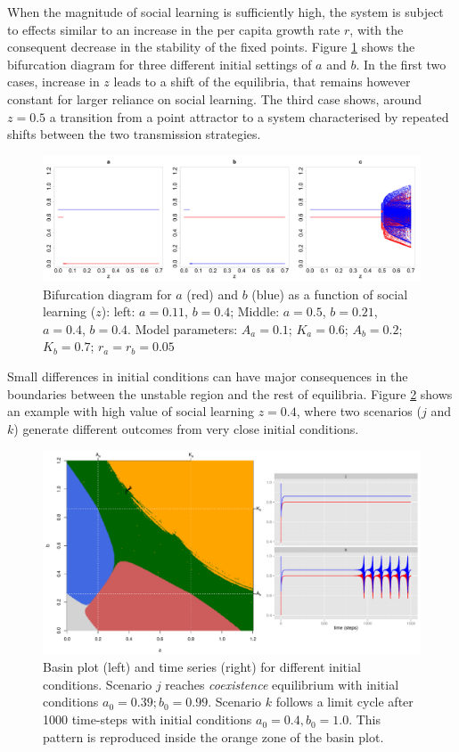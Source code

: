 \documentclass[preprint,authoryear]{elsarticle}
\begin{document}
When the magnitude of social learning is sufficiently high, the system is subject to effects similar to an increase in the per capita growth rate $r$, with the consequent decrease in the stability of the fixed points. Figure \ref{fig:bifurcationWithTransmission} shows the bifurcation diagram for three different initial settings of $a$ and $b$. In the first two cases, increase in $z$ leads to a shift of the equilibria, that remains however constant for larger reliance on social learning. The third case shows, around $z=0.5$ a transition from a point attractor to a system characterised by repeated shifts between the two transmission strategies. 
\begin{figure}[h!]
  \centering
      \includegraphics[width=\textwidth]{./figures/figure4.jpg}
  \caption{Bifurcation diagram for $a$ (red) and $b$ (blue) as a function of social learning ($z$): left: $a=0.11$, $b=0.4$; Middle: $a=0.5$, $b=0.21$, $a=0.4$, $b=0.4$. Model parameters:  $A_a=0.1$; $K_a=0.6$; $A_b=0.2$; $K_b=0.7$; $r_a=r_b=0.05$}
    \label{fig:bifurcationWithTransmission}
\end{figure}

Small differences in initial conditions can have major consequences in the boundaries between the unstable region and the rest of equilibria. Figure \ref{fig:unstable} shows an example with high value of social learning $z=0.4$, where two scenarios ($j$ and $k$) generate different outcomes from very close initial conditions.

\begin{figure}[h!]
  \centering
      \includegraphics[width=\textwidth]{./figures/figureUnstable}   
      \caption{Basin plot (left) and time series (right) for different initial conditions. Scenario $j$ reaches \emph{coexistence} equilibrium with initial conditions $a_0=0.39; b_0=0.99$. Scenario $k$ follows a limit cycle after 1000 time-steps with initial conditions $a_0=0.4,b_0=1.0$. This pattern is reproduced inside the orange zone of the basin plot.}
    \label{fig:unstable}
\end{figure}
\end{document}
